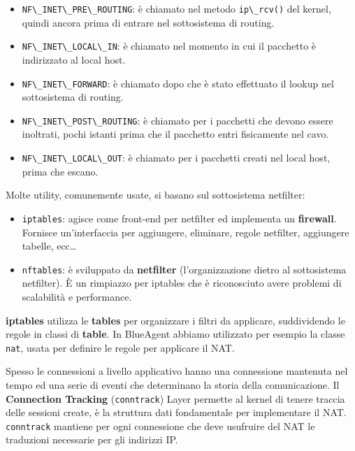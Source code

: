\begin{itemize}
\tightlist
\item
  \passthrough{\lstinline!NF\_INET\_PRE\_ROUTING!}: è chiamato nel
  metodo \passthrough{\lstinline!ip\_rcv()!} del kernel, quindi ancora
  prima di entrare nel sottosistema di routing.
\item
  \passthrough{\lstinline!NF\_INET\_LOCAL\_IN!}: è chiamato nel momento
  in cui il pacchetto è indirizzato al local host.
\item
  \passthrough{\lstinline!NF\_INET\_FORWARD!}: è chiamato dopo che è
  stato effettuato il lookup nel sottosistema di routing.
\item
  \passthrough{\lstinline!NF\_INET\_POST\_ROUTING!}: è chiamato per i
  pacchetti che devono essere inoltrati, pochi istanti prima che il
  pacchetto entri fisicamente nel cavo.
\item
  \passthrough{\lstinline!NF\_INET\_LOCAL\_OUT!}: è chiamato per i
  pacchetti creati nel local host, prima che escano.
\end{itemize}

Molte utility, comunemente usate, si basano sul sottosistema netfilter:

\begin{itemize}
\tightlist
\item
  \passthrough{\lstinline!iptables!}: agisce come front-end per
  netfilter ed implementa un \textbf{firewall}. Fornisce un'interfaccia
  per aggiungere, eliminare, regole netfilter, aggiungere tabelle,
  ecc\ldots{}
\item
  \passthrough{\lstinline!nftables!}: è sviluppato da \textbf{netfilter}
  (l'organizzazione dietro al sottosistema netfilter). È un rimpiazzo
  per iptables che è riconosciuto avere problemi di scalabilità e
  performance.
\end{itemize}

\textbf{iptables} utilizza le \textbf{tables} per organizzare i filtri
da applicare, suddividendo le regole in classi di \textbf{table}. In
BlueAgent abbiamo utilizzato per esempio la classe
\passthrough{\lstinline!nat!}, usata per definire le regole per
applicare il NAT.

Spesso le connessioni a livello applicativo hanno una connessione
mantenuta nel tempo ed una serie di eventi che determinano la storia
della comunicazione. Il \textbf{Connection Tracking}
(\passthrough{\lstinline!conntrack!}) Layer permette al kernel di tenere
traccia delle sessioni create, è la struttura dati fondamentale per
implementare il NAT. \passthrough{\lstinline!conntrack!} mantiene per
ogni connessione che deve usufruire del NAT le traduzioni necessarie per
gli indirizzi IP.
